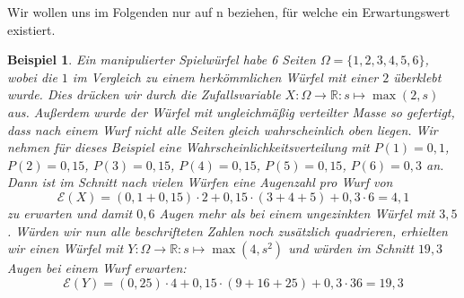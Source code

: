 \documentclass[a4paper]{article}
\newtheorem{beispiel}[satz]{Beispiel}
\theoremstyle{nonumberplain}
\begin{document}
Wir wollen uns im Folgenden nur auf \rvar n beziehen, für welche ein Erwartungswert existiert.
\begin{beispiel}\label{example-expect}
	Ein manipulierter Spielwürfel habe 6 Seiten $\Omega = \{1,2,3,4,5,6\}$, wobei die $1$ im Vergleich zu einem herkömmlichen Würfel mit einer $2$ überklebt wurde. Dies drücken wir durch die Zufallsvariable $X : \Omega \to \mathbb{R} : s \mapsto \max(2,s)$ aus. Außerdem wurde der Würfel mit ungleichmäßig verteilter Masse so gefertigt, dass nach einem Wurf nicht alle Seiten gleich wahrscheinlich oben liegen. Wir nehmen für dieses Beispiel eine Wahrscheinlichkeitsverteilung mit $P(1)=0,1$, $P(2)=0,15$, $P(3)=0,15$, $P(4)=0,15$, $P(5)=0,15$, $P(6)=0,3$ an.
	Dann ist im Schnitt nach vielen Würfen eine Augenzahl pro Wurf von
	\[
	\mathcal{E}(X) = (0,1 + 0,15) \cdot 2 + 0,15 \cdot (3 + 4 + 5) + 0,3 \cdot 6 = 4,1
	\]
	zu erwarten und damit $0,6$ Augen mehr als bei einem ungezinkten Würfel mit \expect{} $3,5$. Würden wir nun alle beschrifteten Zahlen noch zusätzlich quadrieren, erhielten wir einen Würfel mit $Y : \Omega \to \mathbb{R} : s \mapsto \max(4, s^2)$ und würden im Schnitt $19,3$ Augen bei einem Wurf erwarten:
	\[
	\mathcal{E}(Y) = (0,25) \cdot 4 + 0,15 \cdot (9 + 16 + 25) + 0,3 \cdot 36 = 19,3
	\]
\end{beispiel}
\end{document}
